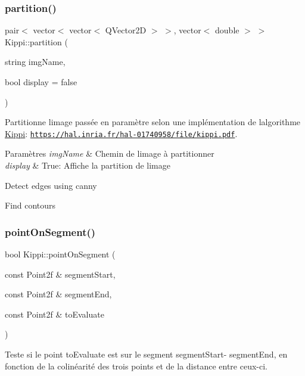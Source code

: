 \subsubsection{\texorpdfstring{partition()}{partition()}}
{\footnotesize\ttfamily pair$<$ vector$<$ vector$<$ Q\+Vector2D $>$ $>$, vector$<$ double $>$ $>$ Kippi\+::partition (\begin{DoxyParamCaption}\item[{string}]{img\+Name,  }\item[{bool}]{display = {\ttfamily false} }\end{DoxyParamCaption})}



Partitionne l\textquotesingle{}image passée en paramètre selon une implémentation de l\textquotesingle{}algorithme \hyperlink{classKippi}{Kippi}\+: \href{https://hal.inria.fr/hal-01740958/file/kippi.pdf}{\tt https\+://hal.\+inria.\+fr/hal-\/01740958/file/kippi.\+pdf}. 


\begin{DoxyParams}{Paramètres}
{\em img\+Name} & Chemin de l\textquotesingle{}image à partitionner \\
\hline
{\em display} & True\+: Affiche la partition de l\textquotesingle{}image \\
\hline
\end{DoxyParams}
Detect edges using canny

Find contours \mbox{\label{classKippi_a8766f581808019895b8a515e18550347}} 
\subsubsection{\texorpdfstring{point\+On\+Segment()}{pointOnSegment()}}
{\footnotesize\ttfamily bool Kippi\+::point\+On\+Segment (\begin{DoxyParamCaption}\item[{const Point2f \&}]{segment\+Start,  }\item[{const Point2f \&}]{segment\+End,  }\item[{const Point2f \&}]{to\+Evaluate }\end{DoxyParamCaption})\hspace{0.3cm}{\ttfamily [private]}}



Teste si le point to\+Evaluate est sur le segment segment\+Start-\/ segment\+End, en fonction de la colinéarité des trois points et de la distance entre ceux-\/ci. 


